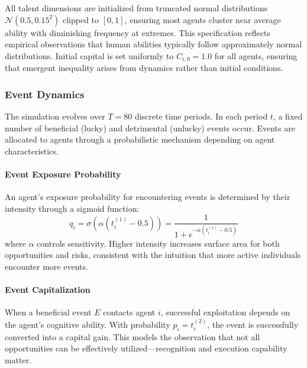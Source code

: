 All talent dimensions are initialized from truncated normal
distributions $\mathcal{N}(0.5, 0.15^{2})$ clipped to $[0,1]$, ensuring most
agents cluster near average ability with diminishing frequency at extremes.
This specification reflects empirical observations that human abilities
typically follow approximately normal distributions. Initial capital is set
uniformly to $C_{i,0}= 1.0$ for all agents, ensuring that emergent
inequality arises from dynamics rather than initial conditions.

\subsubsection{Event Dynamics}

The simulation evolves over $T = 80$ discrete time periods. In each
period $t$, a fixed number of beneficial (lucky) and detrimental (unlucky)
events occur. Events are allocated to agents through a probabilistic
mechanism depending on agent characteristics.

\paragraph{Event Exposure Probability}
An agent's exposure probability for encountering events is determined by
their intensity through a sigmoid function:
\begin{equation}
  q_{i} = \sigma(\alpha(t_{i}^{(1)}- 0.5)) = \frac{1}{1 + e^{-\alpha(t_i^{(1)}
  - 0.5)}}
\end{equation}
where $\alpha$ controls sensitivity. Higher intensity increases surface area
for both opportunities and risks, consistent with the intuition that
more active individuals encounter more events.

\paragraph{Event Capitalization}
When a beneficial event $E$ contacts agent $i$, successful exploitation
depends on the agent's cognitive ability. With probability $p_{i} = t_{i}
^{(2)}$, the event is successfully converted into a capital gain. This models
the observation that not all opportunities can be effectively utilized—recognition
and execution capability matter.

